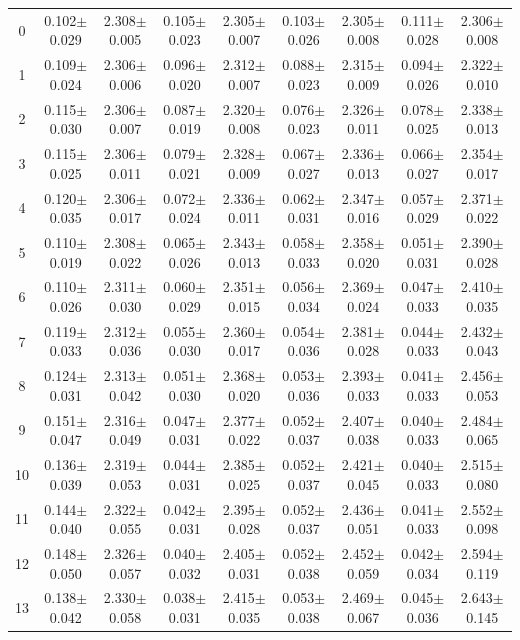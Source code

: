 \begin{table}[H]
{\begin{tabular}{c cc cc cc cc}
0 & 0.102$\pm$0.029 & 2.308$\pm$0.005 & 0.105$\pm$0.023 & 2.305$\pm$0.007 & 0.103$\pm$0.026 & 2.305$\pm$0.008 & 0.111$\pm$0.028 & 2.306$\pm$0.008 \\
1 & 0.109$\pm$0.024 & 2.306$\pm$0.006 & 0.096$\pm$0.020 & 2.312$\pm$0.007 & 0.088$\pm$0.023 & 2.315$\pm$0.009 & 0.094$\pm$0.026 & 2.322$\pm$0.010 \\
2 & 0.115$\pm$0.030 & 2.306$\pm$0.007 & 0.087$\pm$0.019 & 2.320$\pm$0.008 & 0.076$\pm$0.023 & 2.326$\pm$0.011 & 0.078$\pm$0.025 & 2.338$\pm$0.013 \\
3 & 0.115$\pm$0.025 & 2.306$\pm$0.011 & 0.079$\pm$0.021 & 2.328$\pm$0.009 & 0.067$\pm$0.027 & 2.336$\pm$0.013 & 0.066$\pm$0.027 & 2.354$\pm$0.017 \\
4 & 0.120$\pm$0.035 & 2.306$\pm$0.017 & 0.072$\pm$0.024 & 2.336$\pm$0.011 & 0.062$\pm$0.031 & 2.347$\pm$0.016 & 0.057$\pm$0.029 & 2.371$\pm$0.022 \\
5 & 0.110$\pm$0.019 & 2.308$\pm$0.022 & 0.065$\pm$0.026 & 2.343$\pm$0.013 & 0.058$\pm$0.033 & 2.358$\pm$0.020 & 0.051$\pm$0.031 & 2.390$\pm$0.028 \\
6 & 0.110$\pm$0.026 & 2.311$\pm$0.030 & 0.060$\pm$0.029 & 2.351$\pm$0.015 & 0.056$\pm$0.034 & 2.369$\pm$0.024 & 0.047$\pm$0.033 & 2.410$\pm$0.035 \\
7 & 0.119$\pm$0.033 & 2.312$\pm$0.036 & 0.055$\pm$0.030 & 2.360$\pm$0.017 & 0.054$\pm$0.036 & 2.381$\pm$0.028 & 0.044$\pm$0.033 & 2.432$\pm$0.043 \\
8 & 0.124$\pm$0.031 & 2.313$\pm$0.042 & 0.051$\pm$0.030 & 2.368$\pm$0.020 & 0.053$\pm$0.036 & 2.393$\pm$0.033 & 0.041$\pm$0.033 & 2.456$\pm$0.053 \\
9 & 0.151$\pm$0.047 & 2.316$\pm$0.049 & 0.047$\pm$0.031 & 2.377$\pm$0.022 & 0.052$\pm$0.037 & 2.407$\pm$0.038 & 0.040$\pm$0.033 & 2.484$\pm$0.065 \\
10 & 0.136$\pm$0.039 & 2.319$\pm$0.053 & 0.044$\pm$0.031 & 2.385$\pm$0.025 & 0.052$\pm$0.037 & 2.421$\pm$0.045 & 0.040$\pm$0.033 & 2.515$\pm$0.080 \\
11 & 0.144$\pm$0.040 & 2.322$\pm$0.055 & 0.042$\pm$0.031 & 2.395$\pm$0.028 & 0.052$\pm$0.037 & 2.436$\pm$0.051 & 0.041$\pm$0.033 & 2.552$\pm$0.098 \\
12 & 0.148$\pm$0.050 & 2.326$\pm$0.057 & 0.040$\pm$0.032 & 2.405$\pm$0.031 & 0.052$\pm$0.038 & 2.452$\pm$0.059 & 0.042$\pm$0.034 & 2.594$\pm$0.119 \\
13 & 0.138$\pm$0.042 & 2.330$\pm$0.058 & 0.038$\pm$0.031 & 2.415$\pm$0.035 & 0.053$\pm$0.038 & 2.469$\pm$0.067 & 0.045$\pm$0.036 & 2.643$\pm$0.145 \\

\end{tabular}}
\end{table}
